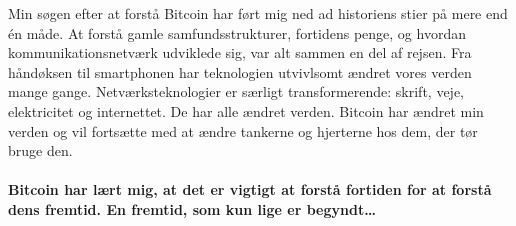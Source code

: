 \documentclass[paper=6in:9in,pagesize=pdftex,headinclude=on,footinclude=on,12pt]{scrbook}
\begin{document}
Min søgen efter at forstå Bitcoin har ført mig ned ad historiens stier på mere end \'en måde. At forstå gamle samfundsstrukturer, fortidens penge, og hvordan kommunikationsnetværk udviklede sig, var alt sammen en del af rejsen. Fra håndøksen til smartphonen har teknologien utvivlsomt ændret vores verden mange gange. Netværksteknologier er særligt transformerende: skrift, veje, elektricitet og internettet. De har alle ændret verden. Bitcoin har ændret min verden og vil fortsætte med at ændre tankerne og hjerterne hos dem, der tør bruge den.\paragraph{Bitcoin har lært mig, at det er vigtigt at forstå fortiden for at forstå dens fremtid. En fremtid, som kun lige er begyndt\ldots}%
%
%
%
%
%
\end{document}
